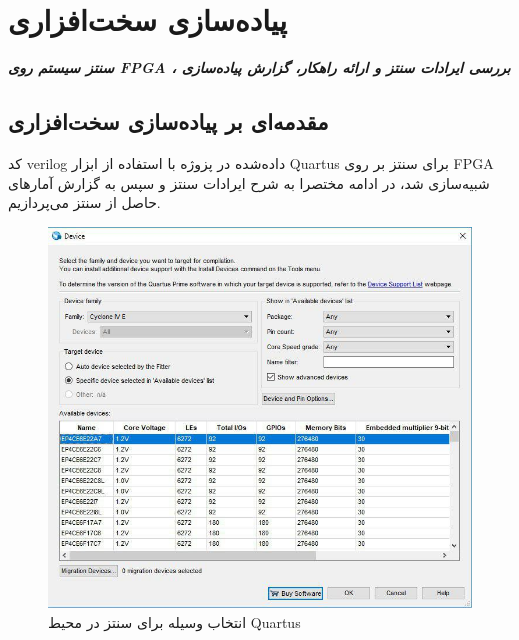 \chapter{پیاده‌سازی سخت‌افزاری}
\noindent
\textbf{
	\textit{
	سنتز سیستم روی FPGA 
	، بررسی ایرادات سنتز و ارائه راهکار، گزارش پیاده‌سازی  
	}
}
\pagebreak

\section{مقدمه‌ای بر پیاده‌سازی سخت‌افزاری}
کد verilog داده‌شده در پزوژه با استفاده از ابزار 
Quartus 
برای سنتز بر روی FPGA شبیه‌سازی شد، در ادامه مختصرا به شرح ایرادات سنتز و سپس به گزارش آمارهای حاصل از سنتز می‌پردازیم. 

\begin{figure}[H]
\includegraphics[width = \textwidth]{figs/synthesize/device.jpg}
\caption{انتخاب وسیله برای سنتز در محیط Quartus}
\end{figure}
